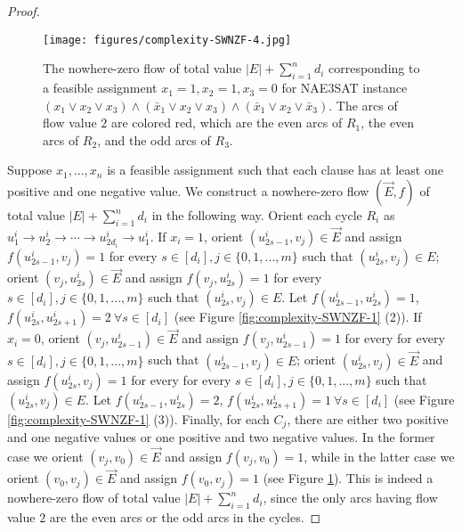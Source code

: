\documentclass[11pt]{article}
\begin{document}
\begin{proof}
        \begin{figure}[htbp]
    \centering
\texttt{[image: figures/complexity-SWNZF-4.jpg]}
        \caption{The nowhere-zero flow of total value $|E|+\sum_{i=1}^n d_i$ corresponding to a feasible assignment $x_1=1,x_2=1,x_3=0$ for NAE3SAT instance $(x_1\vee x_2\vee x_3)\wedge (\bar{x}_1\vee x_2\vee x_3)\wedge (\bar{x}_1\vee x_2\vee \bar{x}_3)$. The arcs of flow value $2$ are colored red, which are the even arcs of $R_1$, the even arcs of $R_2$, and the odd arcs of $R_3$.}
        \label{fig:complexity-SWNZF-4}
    \end{figure}
    Suppose $x_1,...,x_n$ is a feasible assignment such that each clause has at least one positive and one negative value. We construct a nowhere-zero flow $(\vec{E},f)$ of total value $|E|+\sum_{i=1}^n d_i$ in the following way. Orient each cycle $R_i$ as $u^i_1\rightarrow u^i_2\rightarrow\cdots \rightarrow u^i_{2d_i}\rightarrow u^i_1$. If $x_i=1$, orient $(u^i_{2s-1},v_j)\in \vec{E}$ and assign $f(u^i_{2s-1},v_j)=1$ for every $s\in[d_i], j\in \{0,1,...,m\}$ such that $(u^i_{2s},v_j)\in E$; orient $(v_j, u^i_{2s})\in \vec{E}$ and assign $f(v_j,u^i_{2s})=1$ for every $s\in[d_i], j\in \{0,1,...,m\}$ such that $(u^i_{2s},v_j)\in E$. Let $f(u^i_{2s-1},u^i_{2s})=1$, $f(u^i_{2s},u^i_{2s+1})=2\ \forall s\in[d_i]$ (see Figure \ref{fig:complexity-SWNZF-1} (2)). If $x_i=0$, orient $(v_j,u^i_{2s-1})\in \vec{E}$ and assign $f(v_j,u^i_{2s-1})=1$ for every  for every $s\in[d_i], j\in \{0,1,...,m\}$ such that $(u^i_{2s-1},v_j)\in E$; orient $(u^i_{2s},v_j)\in \vec{E}$ and assign $f(u^i_{2s},v_j)=1$ for every for every $s\in[d_i], j\in \{0,1,...,m\}$ such that $(u^i_{2s},v_j)\in E$. Let $f(u^i_{2s-1},u^i_{2s})=2$, $f(u^i_{2s},u^i_{2s+1})=1\ \forall s\in[d_i]$ (see Figure \ref{fig:complexity-SWNZF-1} (3)). Finally, for each $C_j$, there are either two positive and one negative values or one positive and two negative values. In the former case we orient $(v_j,v_0)\in \vec{E}$ and assign $f(v_j,v_0)=1$, while in the latter case we orient $(v_0,v_j)\in \vec{E}$ and assign $f(v_0,v_j)=1$ (see Figure \ref{fig:complexity-SWNZF-4}). This is indeed a nowhere-zero flow of total value $|E|+\sum_{i=1}^n d_i$, since the only arcs having flow value $2$ are the even arcs or the odd arcs in the cycles. 



\end{proof}
\end{document}
